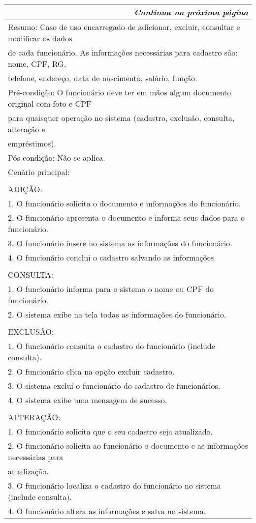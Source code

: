 \begin{longtable}{|l|}
\hline
\endfirsthead %
\hline
\hline
\hline
\endhead
\hline \multicolumn{3}{r}{\emph{Continua na próxima página}}%
\endfoot
\hline
\endlastfoot
Nome: Manter Funcionário\\ \hline
Resumo: Caso de uso encarregado de adicionar, excluir, consultar e modificar os dados \\ de cada funcionário. As informações necessárias para cadastro são: nome, CPF, RG, \\ telefone, endereço, data de nascimento, salário, função.\\ \hline
Pré-condição:  O funcionário deve ter em mãos algum documento original com foto e CPF\\ para quaisquer operação no sistema (cadastro, exclusão, consulta, alteração e \\ empréstimos).\\ \hline
Pós-condição: Não se aplica.\\ \hline
Cenário principal:\\ \\ ADIÇÃO:\\        1. O funcionário solicita o documento e informações do funcionário.\\        2. O funcionário apresenta o documento e informa seus dados para o funcionário.\\        3. O funcionário insere no sistema as informações do funcionário.\\         4. O funcionário conclui o cadastro salvando as informações.  \\ \\ CONSULTA:\\        1. O funcionário informa para o sistema o nome ou CPF do funcionário.\\        2. O sistema exibe na tela todas as informações do funcionário.\\ \\ EXCLUSÃO:\\        1. O funcionário consulta o cadastro do funcionário (include consulta).\\        2. O funcionário clica na opção excluir cadastro.\\        3. O sistema exclui o funcionário do cadastro de funcionários.\\        4. O sistema exibe uma mensagem de sucesso.\\ \\ ALTERAÇÃO:\\        1. O funcionário solicita que o seu cadastro seja atualizado.\\        2. O funcionário solicita ao funcionário o documento e as informações necessárias para \\atualização. \\        3. O funcionário localiza o cadastro do funcionário no sistema (include consulta).\\        4. O funcionário altera as informações e salva no sistema.\\ \hline

\end{longtable}
